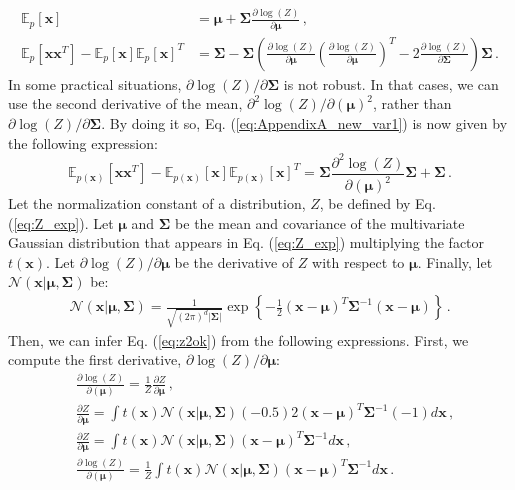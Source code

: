 \begin{align}
\mathds{E}_{p}[\mathbf{x}]  & = \bm{\mu} + \bm{\Sigma} \frac{\partial  \log(Z)}{\partial \bm{\mu}} \,, 
\label{eq:AppendixA_new_mean}\\
\mathds{E}_{p}[\mathbf{x}\mathbf{x}^T] - 
\mathds{E}_{p}[\mathbf{x}] \mathds{E}_{p}[\mathbf{x}]^T
&  = \bm{\Sigma} - \bm{\Sigma}\left(\frac{\partial  \log(Z)}{\partial \bm{\mu}} 
\left(\frac{\partial  \log(Z)}{\partial \bm{\mu}}\right)^T  - 2 \frac{\partial \log(Z)}{\partial \bm{\Sigma}} \right) \bm{\Sigma} \,.
\label{eq:AppendixA_new_var}
\end{align}
In some practical situations, $\partial \log(Z) / \partial \boldsymbol{\Sigma}$ is not robust. In that cases, we can use the second derivative of the mean, $\partial^2 \log (Z) / \partial (\boldsymbol{\mu})^2$, rather than $\partial \log(Z) / \partial \boldsymbol{\Sigma}$. By doing it so, Eq. (\ref{eq:AppendixA_new_var1}) is now given by the following expression:
\begin{equation}
\mathds{E}_{p(\mathbf{x})}[\mathbf{x}\mathbf{x}^T] - \mathds{E}_{p(\mathbf{x})}[\mathbf{x}] \mathds{E}_{p(\mathbf{x})}[\mathbf{x}]^T
 = \boldsymbol{\Sigma} \frac{\partial^2 \log (Z)}{\partial (\boldsymbol{\mu})^2} \boldsymbol{\Sigma} + \boldsymbol{\Sigma}\,.
\label{eq:z2ok}
\end{equation}
Let the normalization constant of a distribution, $Z$, be defined by Eq. (\ref{eq:Z_exp}). Let $\boldsymbol{\mu}$ and $\boldsymbol{\Sigma}$ be the mean and covariance of the multivariate Gaussian distribution that appears in Eq. (\ref{eq:Z_exp}) multiplying the factor $t(\mathbf{x})$. Let $\partial \log (Z)/\partial \boldsymbol{\mu}$ be the derivative of $Z$ with respect to $\boldsymbol{\mu}$. Finally, let $\mathcal{N}(\mathbf{x}|\bm{\mu}, \bm{\Sigma})$ be:
\begin{align}
\mathcal{N}(\mathbf{x}|\bm{\mu}, \bm{\Sigma}) = \frac{1}{\sqrt{(2\pi)^d |\bm{\Sigma}|}} 
\exp \left\{ - \frac{1}{2} \left( \mathbf{x} - \bm{\mu} \right)^T \bm{\Sigma}^{-1} 
\left( \mathbf{x} - \bm{\mu} \right) \right\}\,. \label{eq:Appendix_Gaussian}
\end{align}
Then, we can infer Eq. (\ref{eq:z2ok}) from the following expressions. First, we compute the first derivative, $\partial \log (Z)/\partial \boldsymbol{\mu}$:
\begin{align}
&  \frac{\partial \log (Z)}{\partial (\boldsymbol{\mu})} = \frac{1}{Z} \frac{\partial Z}{\partial \boldsymbol{\mu}} \nonumber \,, \\
& \frac{\partial Z}{\partial \boldsymbol{\mu}} = \int t(\mathbf{x}) \mathcal{N}(\mathbf{x}|\boldsymbol{\mu}, \boldsymbol{\Sigma}) (-0.5) 2 (\mathbf{x} - \boldsymbol{\mu})^T \boldsymbol{\Sigma}^{-1} (-1) d \mathbf{x} \nonumber \,, \\
& \frac{\partial Z}{\partial \boldsymbol{\mu}} = \int t(\mathbf{x}) \mathcal{N}(\mathbf{x}|\boldsymbol{\mu}, \boldsymbol{\Sigma}) (\mathbf{x} - \boldsymbol{\mu})^T \boldsymbol{\Sigma}^{-1} d \mathbf{x} \nonumber \,, \\
& \frac{\partial \log (Z)}{\partial (\boldsymbol{\mu})} = \frac{1}{Z} \int t(\mathbf{x}) \mathcal{N}(\mathbf{x}|\boldsymbol{\mu}, \boldsymbol{\Sigma}) (\mathbf{x} - \boldsymbol{\mu})^T \boldsymbol{\Sigma}^{-1} d \mathbf{x} \,. 
\end{align}
